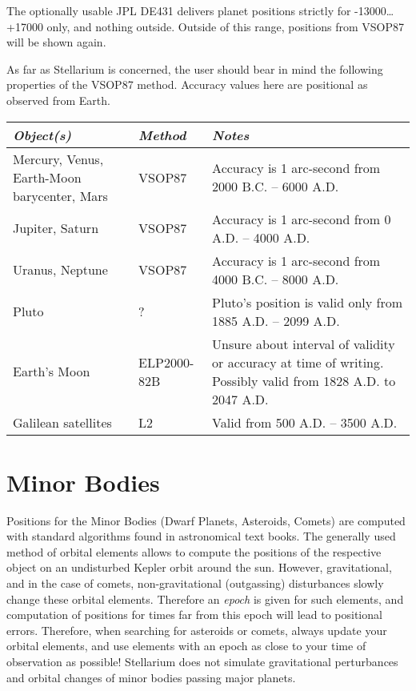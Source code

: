 The optionally usable JPL DE431 delivers planet positions strictly for
-13000\ldots+17000 only, and nothing outside. Outside of this range,
positions from VSOP87 will be shown again.

As far as Stellarium is concerned, the user should bear in mind the
following properties of the VSOP87 method. Accuracy values here are
positional as observed from Earth.

\newpage
\begin{longtabu} to \textwidth {X|l|X}
\toprule
\emph{Object(s)} & \emph{Method} & \emph{Notes}\tabularnewline
\midrule
Mercury, Venus, Earth-Moon barycenter, Mars & VSOP87 & Accuracy is 1 arc-second from 2000 B.C. -- 6000 A.D. \\\midrule
Jupiter, Saturn                             & VSOP87 & Accuracy is 1 arc-second from 0 A.D. -- 4000 A.D.    \\\midrule
Uranus, Neptune                             & VSOP87 & Accuracy is 1 arc-second from 4000 B.C. -- 8000 A.D. \\\midrule
Pluto                                       & ?      & Pluto's position is valid only from 1885 A.D. -- 2099 A.D.\\\midrule
Earth's Moon                                & ELP2000-82B & Unsure about interval of validity or accuracy at time of writing. Possibly valid from 1828 A.D. to 2047 A.D.\\\midrule
Galilean satellites                         & L2     & Valid from 500 A.D. -- 3500 A.D.\\
\bottomrule
\end{longtabu}


\section{Minor Bodies}
\label{sec:Accuracy:MinorBodies}

Positions for the Minor Bodies (Dwarf Planets, Asteroids, Comets) are
computed with standard algorithms found in astronomical text
books. The generally used method of orbital elements allows to compute
the positions of the respective object on an undisturbed Kepler orbit
around the sun. However, gravitational, and in the case of comets,
non-gravitational (outgassing) disturbances slowly change these
orbital elements. Therefore an \emph{epoch} is given for such
elements, and computation of positions for times far from this epoch
will lead to positional errors. Therefore, when searching for
asteroids or comets, always update your orbital elements, and use
elements with an epoch as close to your time of observation as
possible! Stellarium does not simulate gravitational perturbances and
orbital changes of minor bodies passing major planets.

